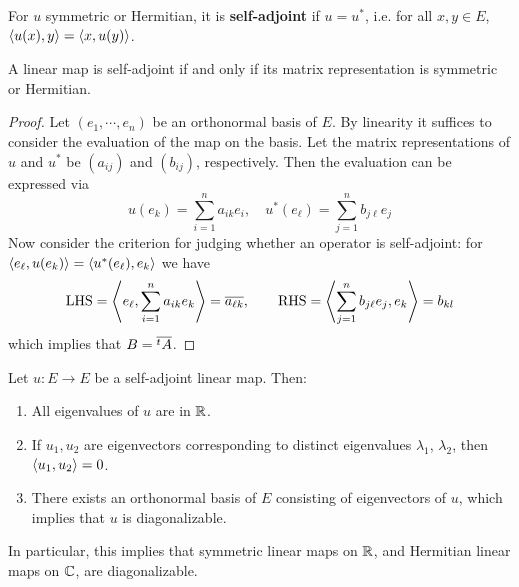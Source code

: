 \documentclass{article}
\begin{document}
\begin{definition}
    For $u$ symmetric or Hermitian, it is \textbf{self-adjoint} if $u = u^{\ast}$, i.e. for all $x, y \in E$, $\left\langle u(x), y \right\rangle = \left\langle x, u(y) \right\rangle$.
\end{definition}

\begin{proposition}
    A linear map is self-adjoint if and only if its matrix representation is symmetric or Hermitian.
\end{proposition}

\begin{proof}
    Let $(e_1, \cdots, e_n)$ be an orthonormal basis of $E$. By linearity it suffices to consider the evaluation of the map on the basis. Let the matrix representations of $u$ and $u^{\ast}$ be $(a_{ij})$ and $(b_{ij})$, respectively. Then the evaluation can be expressed via
    \[
        u(e_k) = \sum\limits_{i=1}^n a_{ik} e_i, \quad u^{\ast} (e_{\ell}) = \sum\limits_{j=1}^n b_{j \ell} e_j
    \]
    Now consider the criterion for judging whether an operator is self-adjoint: for $\left\langle e_{\ell}, u(e_k) \right\rangle = \left\langle u^{\ast}(e_{\ell}), e_k \right\rangle$ we have
    \[
        \text{LHS} = \left\langle e_{\ell}, \sum_{i=1}^n a_{ik} e_k \right\rangle = \overline{a_{\ell k}}, \qquad \text{RHS} = \left\langle \sum_{j=1}^n b_{j\ell} e_j, e_k \right\rangle = b_{kl}
    \]
    which implies that $B = \overline{^tA}$.
\end{proof}

\begin{theorem}\label{thm: Spectral}
    Let $u: E \to E$ be a self-adjoint linear map. Then:
    \begin{enumerate}[label=\roman*)]
        \item All eigenvalues of $u$ are in $\mathbb{R}$.
        \item If $u_1, u_2$ are eigenvectors corresponding to distinct eigenvalues $\lambda_1$, $\lambda_2$, then $\left\langle u_1, u_2 \right\rangle = 0$.
        \item There exists an orthonormal basis of $E$ consisting of eigenvectors of $u$, which implies that $u$ is diagonalizable.
    \end{enumerate}
\end{theorem}

\begin{remark}
    In particular, this implies that symmetric linear maps on $\mathbb{R}$, and Hermitian linear maps on $\mathbb{C}$, are diagonalizable.
\end{remark}
\end{document}
